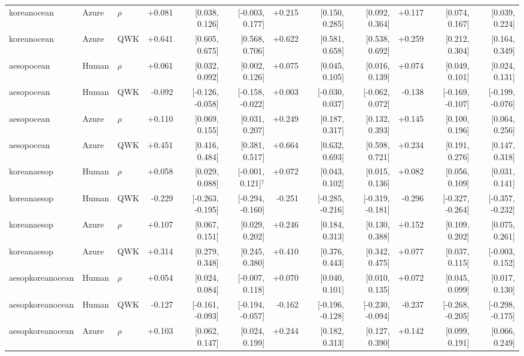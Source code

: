 \begin{landscape}
\begin{longtable}{@{}lllrrrrrrrrr@{}}
koreanocean & Azure & $\rho$ & +0.081 & [0.038, 0.126] & [-0.003, 0.177] & +0.215 & [0.150, 0.285] & [0.092, 0.364] & +0.117 & [0.074, 0.167] & [0.039, 0.224]\\
koreanocean & Azure & QWK & +0.641 & [0.605, 0.675] & [0.568, 0.706] & +0.622 & [0.581, 0.658] & [0.538, 0.692] & +0.259 & [0.212, 0.304] & [0.164, 0.349]\\
\addlinespace[2pt]
aesopocean & Human & $\rho$ & +0.061 & [0.032, 0.092] & [0.002, 0.126] & +0.075 & [0.045, 0.105] & [0.016, 0.139] & +0.074 & [0.049, 0.101] & [0.024, 0.131]\\
aesopocean & Human & QWK & -0.092 & [-0.126, -0.058] & [-0.158, -0.022] & +0.003 & [-0.030, 0.037] & [-0.062, 0.072] & -0.138 & [-0.169, -0.107] & [-0.199, -0.076]\\
aesopocean & Azure & $\rho$ & +0.110 & [0.069, 0.155] & [0.031, 0.207] & +0.249 & [0.187, 0.317] & [0.132, 0.393] & +0.145 & [0.100, 0.196] & [0.064, 0.256]\\
aesopocean & Azure & QWK & +0.451 & [0.416, 0.484] & [0.381, 0.517] & +0.664 & [0.632, 0.693] & [0.598, 0.721] & +0.234 & [0.191, 0.276] & [0.147, 0.318]\\
\addlinespace[2pt]
koreanaesop & Human & $\rho$ & +0.058 & [0.029, 0.088] & [-0.001, 0.121]$^{\dagger}$ & +0.072 & [0.043, 0.102] & [0.015, 0.136] & +0.082 & [0.056, 0.109] & [0.031, 0.141]\\
koreanaesop & Human & QWK & -0.229 & [-0.263, -0.195] & [-0.294, -0.160] & -0.251 & [-0.285, -0.216] & [-0.319, -0.181] & -0.296 & [-0.327, -0.264] & [-0.357, -0.232]\\
koreanaesop & Azure & $\rho$ & +0.107 & [0.067, 0.151] & [0.029, 0.202] & +0.246 & [0.184, 0.313] & [0.130, 0.388] & +0.152 & [0.109, 0.202] & [0.075, 0.261]\\
koreanaesop & Azure & QWK & +0.314 & [0.279, 0.348] & [0.245, 0.380] & +0.410 & [0.376, 0.443] & [0.342, 0.475] & +0.077 & [0.037, 0.115] & [-0.003, 0.152]\\
\addlinespace[2pt]
aesopkoreanocean & Human & $\rho$ & +0.054 & [0.024, 0.084] & [-0.007, 0.118] & +0.070 & [0.040, 0.101] & [0.010, 0.135] & +0.072 & [0.045, 0.099] & [0.017, 0.130]\\
aesopkoreanocean & Human & QWK & -0.127 & [-0.161, -0.093] & [-0.194, -0.057] & -0.162 & [-0.196, -0.128] & [-0.230, -0.094] & -0.237 & [-0.268, -0.205] & [-0.298, -0.175]\\
aesopkoreanocean & Azure & $\rho$ & +0.103 & [0.062, 0.147] & [0.024, 0.199] & +0.244 & [0.182, 0.313] & [0.127, 0.390] & +0.142 & [0.099, 0.191] & [0.066, 0.249]\\

\end{longtable}
\end{landscape}
